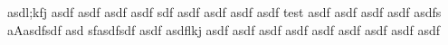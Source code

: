 asdl;kfj asdf asdf asdf asdf sdf asdf asdf asdf asdf test asdf asdf asdf asdf asdfs aAasdfsdf asd sfasdfsdf asdf asdflkj asdf asdf asdf asdf asdf asdf asdf asdf asdf
